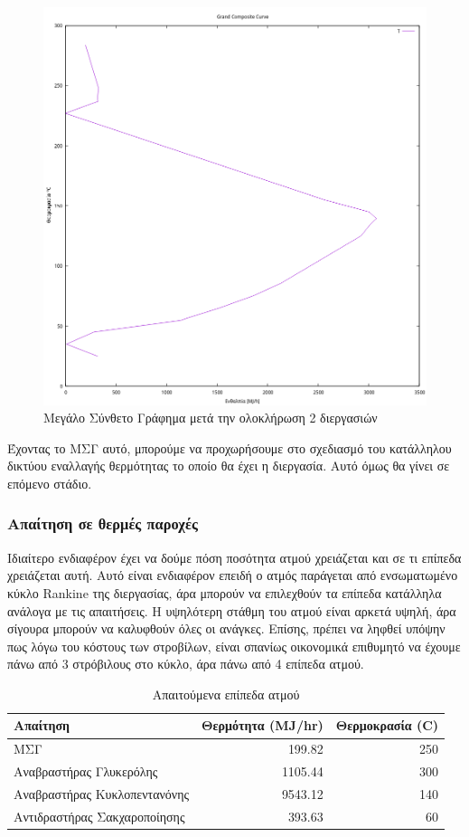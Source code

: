 \documentclass[11pt]{article}
\begin{document}
\begin{figure}[htbp]
\centering
\includegraphics[width=.9\linewidth]{Diagrams/grand_composite_curve_4.png}
\caption{Μεγάλο Σύνθετο Γράφημα μετά την ολοκλήρωση 2 διεργασιών}
\end{figure}

Έχοντας το ΜΣΓ αυτό, μπορούμε να προχωρήσουμε στο σχεδιασμό του κατάλληλου δικτύου εναλλαγής θερμότητας το οποίο θα έχει η διεργασία. Αυτό όμως θα γίνει σε επόμενο στάδιο.

\pagebreak

\subsubsection{Απαίτηση σε θερμές παροχές}
\label{sec:org4fd5781}
Ιδιαίτερο ενδιαφέρον έχει να δούμε πόση ποσότητα ατμού χρειάζεται και σε τι επίπεδα χρειάζεται αυτή. Αυτό είναι ενδιαφέρον επειδή ο ατμός παράγεται από ενσωματωμένο κύκλο Rankine της διεργασίας, άρα μπορούν να επιλεχθούν τα επίπεδα κατάλληλα ανάλογα με τις απαιτήσεις. Η υψηλότερη στάθμη του ατμού είναι αρκετά υψηλή, άρα σίγουρα μπορούν να καλυφθούν όλες οι ανάγκες. Επίσης, πρέπει να ληφθεί υπόψην πως λόγω του κόστους των στροβίλων, είναι σπανίως οικονομικά επιθυμητό να έχουμε πάνω από 3 στρόβιλους στο κύκλο, άρα πάνω από 4 επίπεδα ατμού.

\begin{table}[htbp]
\caption{Απαιτούμενα επίπεδα ατμού}
\centering
\begin{tabular}{lrr}
Απαίτηση & Θερμότητα (MJ/hr) & Θερμοκρασία (C)\\
\hline
ΜΣΓ & 199.82 & 250\\
Αναβραστήρας Γλυκερόλης & 1105.44 & 300\\
Αναβραστήρας Κυκλοπεντανόνης & 9543.12 & 140\\
Αντιδραστήρας Σακχαροποίησης & 393.63 & 60\\
\end{tabular}
\end{table}
\end{document}
